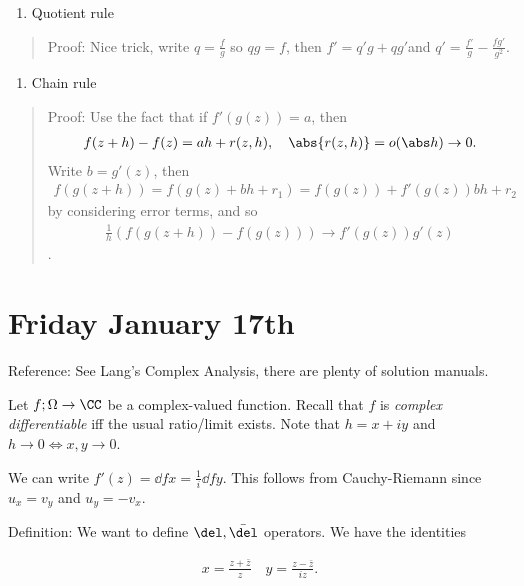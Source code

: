 \begin{enumerate}
\def\labelenumi{\arabic{enumi}.}
\setcounter{enumi}{2}
\tightlist
\item
  Quotient rule
\end{enumerate}

\begin{quote}
Proof: Nice trick, write \(q = \frac f g\) so \(qg = f\), then
\(f' = q'g + qg'\)and \(q' = \frac {f'} g - \frac{fg'}{g^2}\).
\end{quote}

\begin{enumerate}
\def\labelenumi{\arabic{enumi}.}
\setcounter{enumi}{3}
\tightlist
\item
  Chain rule
\end{enumerate}

\begin{quote}
Proof: Use the fact that if \(f'(g(z)) = a\), then
\begin{align*}f(z+h) - f(z) = a h + r(z, h),\quad \abs{r(z, h)} = o(\abs h) \to 0.\end{align*}
Write \(b = g'(z)\), then
\begin{align*}f(g(z + h)) = f(g(z) + b h + r_1 ) = f(g(z)) + f'(g(z))bh + r_2\end{align*}
by considering error terms, and so
\begin{align*}\frac 1 h (f(g(z+h)) - f(g(z))) \to f'(g(z)) g'(z)\end{align*}.
\end{quote}

\hypertarget{friday-january-17th}{%
\section{Friday January 17th}\label{friday-january-17th}}

Reference: See Lang's Complex Analysis, there are plenty of solution
manuals.

Let \(f; \Omega \to \CC\) be a complex-valued function. Recall that
\(f\) is \emph{complex differentiable} iff the usual ratio/limit exists.
Note that \(h = x+iy\) and \(h\to 0 \iff x,y\to 0\).

We can write \(f'(z) = \dd{f}{x} = \frac 1 i \dd{f}{y}\). This follows
from Cauchy-Riemann since \(u_x = v_y\) and \(u_y = -v_x\).

Definition: We want to define \(\del, \bar \del\) operators. We have the
identities

\begin{align*}
x = \frac{z + \bar z}{z} \quad y = \frac{z - \bar z}{iz}
.\end{align*}

